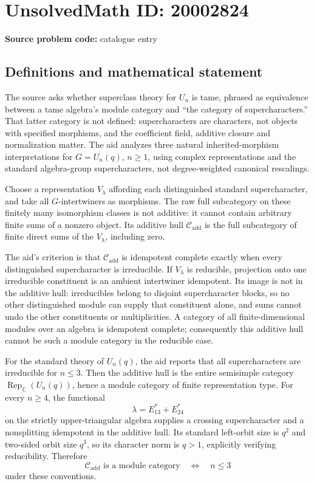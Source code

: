 \documentclass[11pt]{article}
\newcommand{\C}{\mathbb{C}}
\begin{document}
\section*{UnsolvedMath ID: 20002824}
\textbf{Source problem code:} catalogue entry
\subsection{Definitions and mathematical statement}
The source asks whether superclass theory for $U_n$ is tame, phrased as equivalence between a tame algebra's module category and ``the category of supercharacters.'' That latter category is not defined: supercharacters are characters, not objects with specified morphisms, and the coefficient field, additive closure and normalization matter. The aid analyzes three natural inherited-morphism interpretations for $G=U_n(q)$, $n\ge1$, using complex representations and the standard algebra-group supercharacters, not degree-weighted canonical rescalings.

Choose a representation $V_\lambda$ affording each distinguished standard supercharacter, and take all $G$-intertwiners as morphisms. The raw full subcategory on these finitely many isomorphism classes is not additive: it cannot contain arbitrary finite sums of a nonzero object. Its additive hull $\mathcal C_{\mathrm{add}}$ is the full subcategory of finite direct sums of the $V_\lambda$, including zero.

The aid's criterion is that $\mathcal C_{\mathrm{add}}$ is idempotent complete exactly when every distinguished supercharacter is irreducible. If $V_\lambda$ is reducible, projection onto one irreducible constituent is an ambient intertwiner idempotent. Its image is not in the additive hull: irreducibles belong to disjoint supercharacter blocks, so no other distinguished module can supply that constituent alone, and sums cannot undo the other constituents or multiplicities. A category of all finite-dimensional modules over an algebra is idempotent complete; consequently this additive hull cannot be such a module category in the reducible case.

For the standard theory of $U_n(q)$, the aid reports that all supercharacters are irreducible for $n\le3$. Then the additive hull is the entire semisimple category $\operatorname{Rep}_{\C}(U_n(q))$, hence a module category of finite representation type. For every $n\ge4$, the functional
\[
 \lambda=E_{13}^*+E_{24}^*
\]
on the strictly upper-triangular algebra supplies a crossing supercharacter and a nonsplitting idempotent in the additive hull. Its standard left-orbit size is $q^2$ and two-sided orbit size $q^3$, so its character norm is $q>1$, explicitly verifying reducibility. Therefore
\[
 \mathcal C_{\mathrm{add}}\text{ is a module category}
 \quad\Longleftrightarrow\quad n\le3
\]
under these conventions.
\end{document}
